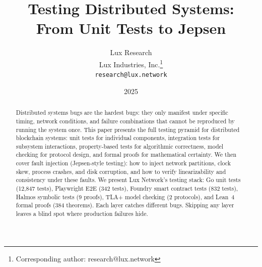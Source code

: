 \documentclass[11pt,a4paper]{article}
\title{Testing Distributed Systems:\\From Unit Tests to Jepsen}
\author{
Lux Research \\
Lux Industries, Inc.\thanks{Corresponding author: research@lux.network}\\
\texttt{research@lux.network}
}
\date{2025}
\begin{document}
\luxcoverpage

\begin{abstract}
Distributed systems bugs are the hardest bugs: they only manifest under specific timing,
network conditions, and failure combinations that cannot be reproduced by running the
system once. This paper presents the full testing pyramid for distributed blockchain
systems: unit tests for individual components, integration tests for subsystem
interactions, property-based tests for algorithmic correctness, model checking for
protocol design, and formal proofs for mathematical certainty. We then cover fault
injection (Jepsen-style testing): how to inject network partitions, clock skew, process
crashes, and disk corruption, and how to verify linearizability and consistency under
these faults. We present Lux Network's testing stack: Go unit tests (12,847 tests),
Playwright E2E (342 tests), Foundry smart contract tests (832 tests), Halmos symbolic
tests (9 proofs), TLA+ model checking (2 protocols), and Lean~4 formal proofs (384
theorems). Each layer catches different bugs. Skipping any layer leaves a blind spot
where production failures hide.
\end{abstract}

\tableofcontents
\newpage














\end{document}
